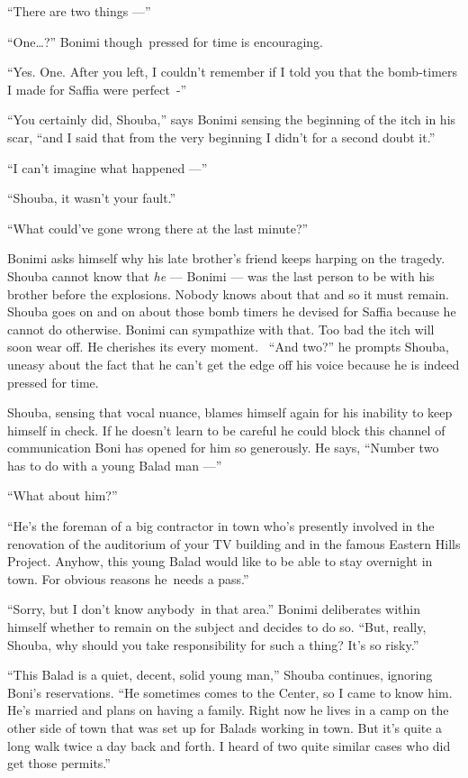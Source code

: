 \documentclass[twoside,11pt]{book}
\begin{document}
``There are two things ---''

``One{\ldots}?'' Bonimi though~pressed for time is encouraging.

``Yes. One. After you left, I couldn't remember if I told you that the bomb-timers I made for Saffia were
perfect~-''

``You certainly did, Shouba,'' says Bonimi sensing the beginning of the itch in his scar,
``and I said that from the very beginning I didn't for a second doubt it.''

``I can't imagine what happened ---''

``Shouba, it wasn't your fault.''

``What could've gone wrong there at the last minute?''

Bonimi asks himself why his late brother's friend keeps harping on the tragedy. Shouba cannot know that \textit{he} ---
Bonimi --- was the last person to be with his brother before the explosions. Nobody knows about that and so it must
remain. Shouba goes on and on about those bomb timers he devised for Saffia because he cannot do otherwise. Bonimi
can sympathize with that. Too bad the itch will soon wear off. He cherishes its every moment. ~``And
two?'' he prompts Shouba, uneasy about the fact that he can't get the edge off  his voice because he is
indeed pressed for time.

Shouba, sensing that vocal nuance, blames himself again for his inability to keep himself in check. If he doesn't learn
to be careful he could block this channel of communication Boni has opened for him so generously. He says,
``Number two has to do with a young Balad man ---''

``What about him?''

``He's the foreman of a big contractor in town who's presently involved in the renovation of the auditorium
of your TV building and in the famous Eastern Hills Project. Anyhow, this young Balad would like to be able to stay
overnight in town. For obvious reasons he~needs a pass.''

``Sorry, but I don't know anybody~in that area.'' Bonimi deliberates within himself whether to
remain on the subject and decides to do so. ``But, really, Shouba, why should you take responsibility for
such a thing? It's so risky.''

``This Balad is a quiet, decent, solid young man,'' Shouba continues, ignoring Boni's
reservations. ``He sometimes comes to the Center, so I came to know him. He's married and plans on having a
family. Right now he lives in a camp on the other side of town that was set up for Balads working in town. But it's
quite a long walk twice a day back and forth. I heard of two quite similar cases who did get those
permits.''
\end{document}
